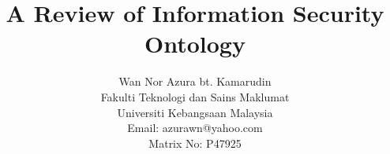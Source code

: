 \documentclass[conference, compsoc]{IEEEtran}
\begin{document}
%
\title{A Review of Information Security Ontology}



\author{Wan Nor Azura bt. Kamarudin\\Fakulti Teknologi dan Sains Maklumat\\Universiti Kebangsaan Malaysia
\\Email: azurawn@yahoo.com\\Matrix No: P47925}


% 




\end{document}
